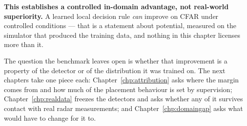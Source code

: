 \textbf{This establishes a controlled in-domain advantage, not real-world superiority.} A learned
local decision rule \emph{can} improve on CFAR under controlled conditions --- that is a statement
about potential, measured on the simulator that produced the training data, and nothing in this
chapter licenses more than it.

The question the benchmark leaves open is whether that improvement is a property of the detector or
of the distribution it was trained on. The next chapters take one piece each:
Chapter~\ref{chp:attribution} asks where the margin comes from and how much of the placement
behaviour is set by supervision; Chapter~\ref{chp:realdata} freezes the detectors and asks whether
any of it survives contact with real radar measurements; and Chapter~\ref{chp:domaingap} asks what
would have to change for it to.

